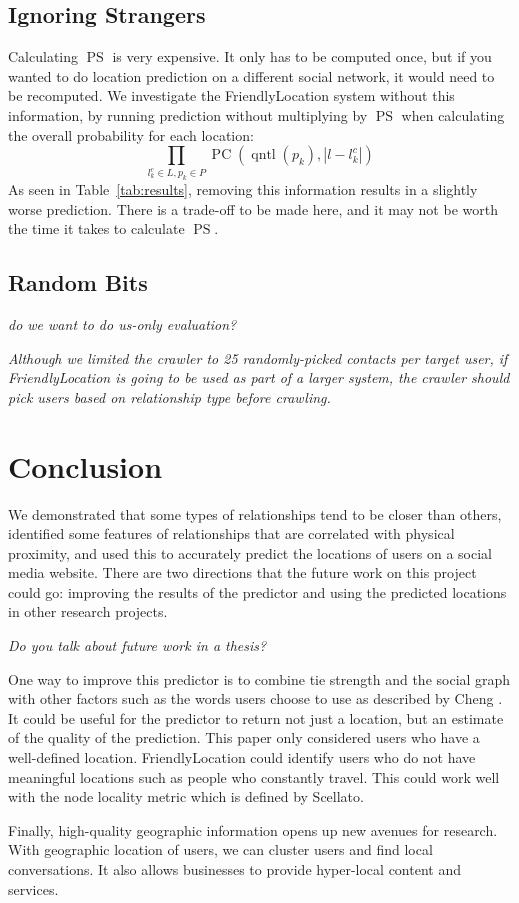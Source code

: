 \documentclass[letterpaper]{article}
\DeclareMathOperator{\pContact}{PC}
\DeclareMathOperator{\pStrangers}{PS}
\DeclareMathOperator{\quantile}{qntl}
\newcommand{\jam}[1]{\emph{#1}}
\newcommand{\flchap}[1]{\section{#1}}
\newcommand{\flsec}[1]{\subsection{#1}}
\begin{document}
\flsec{Ignoring Strangers}
Calculating $\pStrangers$ is very expensive.
%
It only has to be computed once, but if you wanted to do location prediction on
a different social network, it would need to be recomputed.
%
We investigate the FriendlyLocation system without this information, by running
prediction without multiplying by $\pStrangers$ when calculating the overall
probability for each location:
\[
    \prod_{l^c_k \in L,p_k \in P} \pContact(\quantile(p_k),|l-l^c_k|)
\]
As seen in Table~\ref{tab:results}, removing this information results in a
slightly worse prediction.
%
There is a trade-off to be made here, and it may not be worth the time it takes
to calculate $\pStrangers$.

\flsec{Random Bits}

\jam{do we want to do us-only evaluation?}

\jam{ Although we limited the crawler to 25 randomly-picked contacts per target
user, if FriendlyLocation is going to be used as part of a larger system, the
crawler should pick users based on relationship type before crawling.}

\flchap{Conclusion}
We demonstrated that some types of relationships tend to be closer than others,
identified some features of relationships that are correlated with physical
proximity, and used this to accurately predict the locations of users on a
social media website.
There are two directions that the future work on this project could go:
improving the results of the predictor and using the predicted locations in
other research projects.

\emph{Do you talk about future work in a thesis?}

One way to improve this predictor is to combine tie strength and the social
graph with other factors such as the words users choose to use as described by
Cheng \cite{cheng2010you}.
It could be useful for the predictor to return not just a location, but an
estimate of the quality of the prediction.  This paper only considered
users who have a well-defined location. FriendlyLocation could identify users
who do not have meaningful locations such as people who constantly travel.
This could work well with the node locality metric which is defined by
Scellato\cite{scellato2010distance}.

Finally, high-quality geographic information opens up new avenues for research.
With geographic location of users, we can cluster users and find local
conversations.
It also allows businesses to provide hyper-local content and services.





\end{document}
